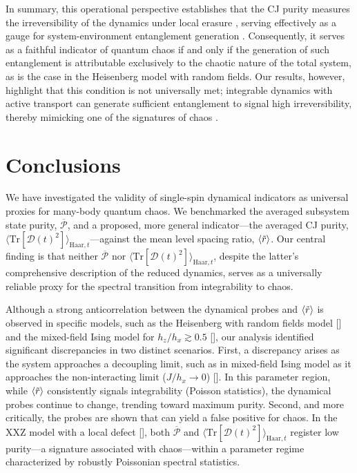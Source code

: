 \documentclass[letterpaper,superscriptaddress,aps,pra,nolongbibliography,showpacs,floatfix,dvipsnames,10pt,twocolumn]{revtex4-2}
\newcommand{\choip}{\langle \text{Tr}[\mathcal{D}(t)^2] \rangle_{\mathrm{Haar}, t}}
\newcommand{\statep}{\overline{\mathcal{P}}}
\begin{document}
In summary, this operational perspective establishes that the CJ
purity measures the irreversibility of the dynamics under local erasure ,
serving effectively as a gauge for system-environment entanglement
generation . Consequently, it serves as a faithful indicator of
quantum chaos if and only if the generation of such entanglement is
attributable exclusively to the chaotic nature of the total system,
as is the case in the Heisenberg model with random fields.
Our results, however, highlight that this condition is not universally
met; integrable dynamics with active transport can generate sufficient
entanglement to signal high irreversibility, thereby mimicking one of
the signatures of chaos .

\section{Conclusions}\label{sec:conclusions}
We have investigated the validity of single-spin dynamical indicators as
universal proxies for many-body quantum chaos. We benchmarked the
averaged subsystem state purity, $\statep$, and a proposed, more
general indicator---the averaged CJ purity, $\choip$---against the
mean level spacing ratio, $\expval{\tilde{r}}$. Our central finding is
that neither $\statep$ nor $\choip$, despite the latter's
comprehensive description of the reduced dynamics, serves as a
universally reliable proxy for the spectral transition from
integrability to chaos.

Although a strong anticorrelation between the dynamical probes and
$\expval{\tilde{r}}$ is observed in specific models, such as the
Heisenberg with random fields model []
and the mixed-field Ising model for $h_z/h_x \gtrsim 0.5$
[], our
analysis identified significant discrepancies in two distinct
scenarios. First, a discrepancy arises as the system approaches a
decoupling limit, such as in mixed-field Ising model as 
it approaches the non-interacting limit ($J/h_x \to 0$) [].
In this parameter region, while $\expval{\tilde{r}}$ consistently
signals integrability (Poisson statistics), the dynamical probes
continue to change, trending toward maximum purity. Second, and
more critically, the probes are shown that can yield a false positive 
for chaos. In the XXZ model with a local defect [],
both $\statep$ and $\choip$ register low purity—a signature associated with
chaos—within a parameter regime characterized by robustly
Poissonian spectral statistics.
\end{document}

